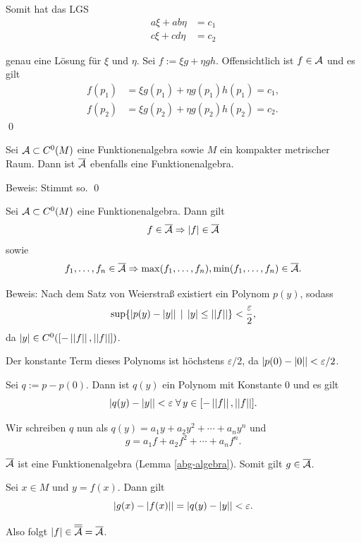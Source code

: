 \begin{frame}
    Somit hat das LGS 
    \begin{align*}
        a \xi + ab \eta &= c_1 \\
        c \xi + cd \eta &= c_2
    \end{align*}

    genau eine Lösung für \( \xi \) und \( \eta \). 
    \pause
    Sei \( f := \xi g + \eta g h \). \pause 
    Offensichtlich ist \( f \in \mathcal{A} \) \pause 
    und es gilt 
    \begin{align*}
        f(p_1) &= \xi g(p_1) + \eta g(p_1) h(p_1) = c_1, \\
        f(p_2) &= \xi g(p_2) + \eta g(p_2) h(p_2) = c_2.
    \end{align*}
    \qed
\end{frame}

\begin{frame}
    \begin{lem}\label{abg-algebra}
        Sei \( \mathcal{A} \subset C^0(M) \) eine Funktionenalgebra 
        sowie \(M\) ein kompakter metrischer Raum.
        Dann ist \( \overline{\mathcal{A}} \) ebenfalls eine Funktionenalgebra.
    \end{lem} \pause
    Beweis: \pause 
    Stimmt so. \qed
\end{frame}

\begin{frame}
    \begin{lem}\label{betrag-in-algebra}
        Sei \( \mathcal{A} \subset C^0(M) \) eine Funktionenalgebra. Dann gilt 
        \[ f \in \overline{\mathcal{A}} \Rightarrow \left|f\right| \in \overline{\mathcal{A}} \]
        sowie 
        \[ f_1, \ldots, f_n \in \overline{\mathcal{A}} \Rightarrow \max(f_1,\ldots, f_n), \min(f_1,\ldots, f_n) \in \overline{\mathcal{A}}. \]
    \end{lem} \pause
    Beweis:
    Nach dem Satz von Weierstraß existiert ein Polynom 
    \( p(y) \), sodass 
    \[ \sup \{ \left| p(y) - \left|y\right| \right| 
    \;|\; \left|y\right| \leq \left|\left|f\right|\right| \} < \frac{\varepsilon}{2}, \]
    da \( \left|y\right| \in C^0([-\left|\left|f\right|\right|, \left|\left|f\right|\right|]) \). 
    \pause

    Der konstante Term dieses Polynoms ist höchstens \( \varepsilon / 2 \), 
    da \( \left| p(0) - \left|0\right| \right| < \varepsilon/2 \).
\end{frame}

\begin{frame}
    Sei \( q := p - p(0) \). Dann ist \( q(y) \) ein 
    Polynom mit Konstante \(0\) und es gilt 
    \[ \abs{ q(y) - \abs{y} } < \varepsilon 
    \;\forall y \in [-\norm{f}, \norm{f}]. \]
    \pause

    Wir schreiben \( q \) nun als 
    \( q(y) = a_1 y + a_2 y^2 + \cdots + a_n y^n \) und 
    \[ g = a_1 f + a_2 f^2 + \cdots + a_n f^n. \]
    \pause

    \( \overline{\mathcal{A}} \) ist eine Funktionenalgebra (Lemma \ref{abg-algebra}).
    Somit gilt \( g \in \overline{\mathcal{A}} \). 
    \pause

    Sei \( x\in M \) und \( y = f(x) \). Dann gilt 
    \[ \left| g(x) - \left|f(x)\right| \right| = \left| q(y) - \left|y\right| \right| < \varepsilon. \]
    \pause
    
    Also folgt \( \left|f\right| \in \overline{\overline{\mathcal{A}}} = \overline{\mathcal{A}} \). 
\end{frame}

